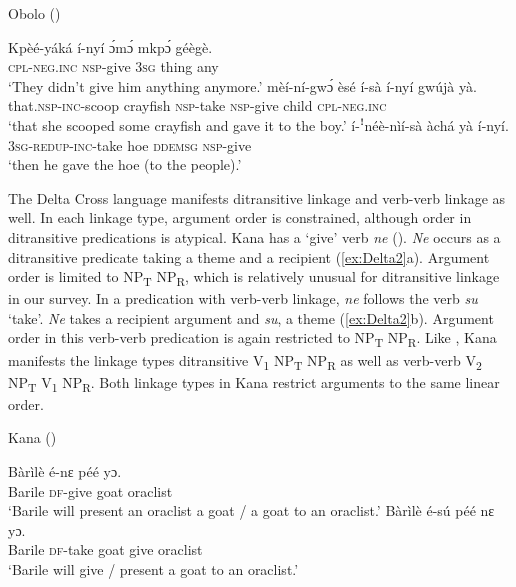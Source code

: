 \documentclass[output=paper,colorlinks,citecolor=brown]{langscibook}
\begin{document}
\ea \label{ex:Delta1} Obolo (\citealt[53, 83]{Aaron1999})
\begin{xlist}
\ex
\gll Kpèé-yáká				í-nyí				ɔ́mɔ́		mkpɔ́		géègè.\\
						\textsc{cpl-neg.inc}		\textsc{nsp}-give		3\textsc{sg}		thing		any\\
\glt						‘They didn’t give him anything anymore.’
\ex
\gll mèí-ní-gwɔ́						èsé					í-sà					í-nyí				gwújà	yà.\\
						that.\textsc{nsp-inc}-scoop		crayfish		\textsc{nsp}-take		\textsc{nsp}-give		child		\textsc{cpl-neg.inc} \\
\glt 			‘that she scooped some crayfish and gave it to the boy.’
\ex 
\gll í-ꜝnéè-nìí-sà							àchá	yà		í-nyí.\\
  \textsc{3sg-redup-inc}-take		hoe		\textsc{ddemsg}		\textsc{nsp}-give \\
\glt 				‘then he gave the hoe (to the people).’
\end{xlist}
\z

The Delta Cross language  manifests ditransitive linkage and verb-verb linkage as well. In each linkage type, argument order is constrained, although order in ditransitive predications is atypical. Kana has a ‘give’ verb \textit{ne} (\cite{Ikoro1996}). \textit{Ne} occurs as a ditransitive predicate taking a theme and a recipient (\ref{ex:Delta2}a). Argument order is limited to NP\textsubscript{T} NP\textsubscript{R}, which is relatively unusual for ditransitive linkage in our survey. In a predication with verb-verb linkage, \textit{ne} follows the verb \textit{su} ‘take’. \textit{Ne} takes a recipient argument and \textit{su}, a theme (\ref{ex:Delta2}b). Argument order in this verb-verb predication is again restricted to NP\textsubscript{T} NP\textsubscript{R}. Like , Kana manifests the linkage types ditransitive V\textsubscript{1} NP\textsubscript{T} NP\textsubscript{R} as well as verb-verb V\textsubscript{2} NP\textsubscript{T} V\textsubscript{1} NP\textsubscript{R}. Both linkage types in Kana restrict arguments to the same linear order.

\ea \label{ex:Delta2} Kana (\cite [254]{Ikoro1996})
\begin{xlist}
\ex
\gll Bàrìlè		é-nɛ				péé		yɔ.\\
			Barile	\textsc{df}-give	goat		oraclist\\
\glt			‘Barile will present an oraclist a goat / a goat to an oraclist.’
\ex
\gll 	Bàrìlè		é-sú				péé		nɛ			yɔ.\\
		Barile	\textsc{df}-take	goat		give		oraclist\\
\glt ‘Barile will give / present a goat to an oraclist.’
\end{xlist}
\z
\end{document}
